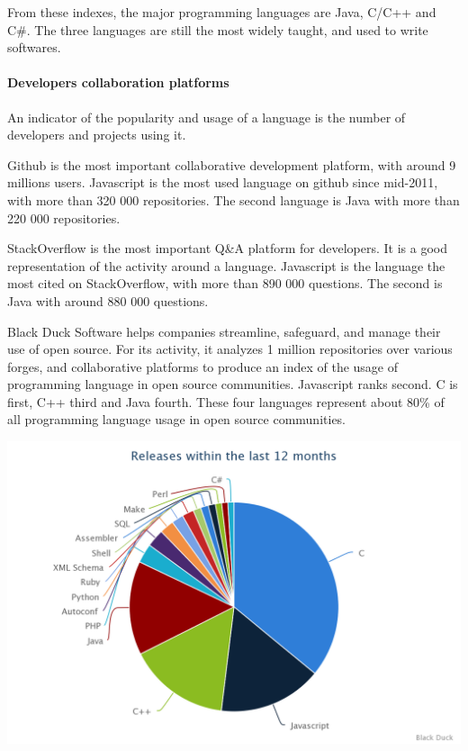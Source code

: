 From these indexes, the major programming languages are Java, C/C++ and C\#.
The three languages are still the most widely taught, and used to write softwares.

\paragraph{Developers collaboration platforms}

An indicator of the popularity and usage of a language is the number of developers and projects using it.

Github is the most important collaborative development platform, with around 9 millions users.
Javascript is the most used language on github since mid-2011, with more than 320 000 repositories.
The second language is Java with more than 220 000 repositories.


StackOverflow is the most important Q\&A platform for developers.
It is a good representation of the activity around a language.
Javascript is the language the most cited on StackOverflow, with more than 890 000 questions.
The second is Java with around 880 000 questions.

Black Duck Software helps companies streamline, safeguard, and manage their use of open source.
For its activity, it analyzes 1 million repositories over various forges, and collaborative platforms to produce an index of the usage of programming language in open source communities.
Javascript ranks second.
C is first, C++ third and Java fourth.
These four languages represent about 80\% of all programming language usage in open source communities.

\includegraphics[width=0.9\linewidth]{../../data/js-trends/black-duck-15}

